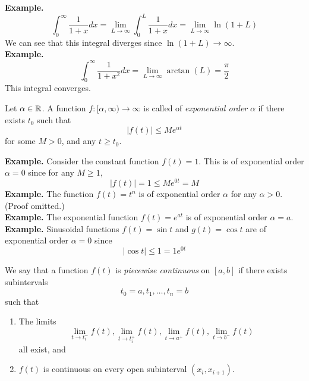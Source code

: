 \documentclass[openany]{report}
\begin{document}
\noindent
\textbf{Example.} 
\[\int_0^\infty \frac{1}{1+x}dx = \lim_{L\rightarrow\infty}\int_0^L \frac{1}{1+x}dx = \lim_{L\rightarrow \infty} \ln(1 + L)\]
We can see that this integral diverges since $\ln(1 + L) \rightarrow \infty$.\\[2ex]
\noindent
\textbf{Example.} 
\[\int_0^\infty \frac{1}{1+x^2}dx = \lim_{L\rightarrow\infty} \arctan(L) = \frac{\pi}{2}\]
This integral converges. 
\begin{definition}
    Let $\alpha \in \mathbb{R}$. A function $f: [\alpha, \infty) \rightarrow \infty$ is called of \emph{exponential order} $\alpha$ if there exists $t_0$ such that  
    \[|f(t)| \leq Me^{\alpha t}\]
    for some $M > 0$, and any $t \geq t_0$. 
\end{definition}
\noindent
\textbf{Example.} Consider the constant function $f(t) = 1$. This is of exponential order $\alpha = 0$ since for any $M \geq 1$, 
\[|f(t)| = 1 \leq Me^{0 t} = M\]
\textbf{Example.} The function $f(t) = t^n$ is of exponential order $\alpha$ for any $\alpha > 0$. (Proof omitted.)\\[2ex]
\textbf{Example.} The exponential function $f(t) = e^{at}$ is of exponential order $\alpha = a$. \\[2ex]
\textbf{Example.} Sinusoidal functions $f(t) = \sin t$ and $g(t) = \cos t$ are of exponential order $\alpha = 0$ since 
\[|\cos t| \leq 1 = 1 e^{0 t}\]
\begin{definition}
    We say that a function $f(t)$ is \emph{piecewise continuous} on $[a,b]$ if there exists subintervals 
    \[t_0 = a, t_1, \ldots, t_n = b\]
    such that 
    \begin{enumerate}[label=(\roman*)]
        \item The limits 
        \[\lim_{t \rightarrow t_i^-}f(t), \lim_{t\rightarrow t_i^+} f(t), \lim_{t\rightarrow a^+}f(t), \lim_{t\rightarrow b^-}f(t)\]
        all exist, and
        \item $f(t)$ is continuous on every open subinterval $(x_i, x_{i+1})$.
    \end{enumerate}
\end{definition}
\end{document}
